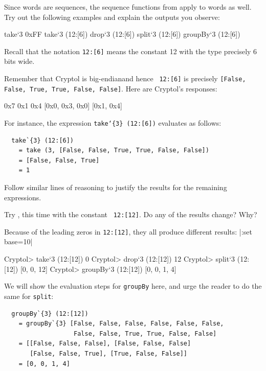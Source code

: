 \restartrepl
\begin{Exercise}\label{ex:words:4}
Since words are sequences, the sequence functions from
 apply to words as well.
Try out the following examples and explain the outputs you
observe:\indTake\indDrop\indSplit\indGroup
\begin{replinVerb}
  take`{3} 0xFF
  take`{3} (12:[6])
  drop`{3} (12:[6])
  split`{3} (12:[6])
  groupBy`{3} (12:[6])
\end{replinVerb}
\end{Exercise}
\noindent Recall that the notation {\tt 12:[6]} means the constant 12
with the type precisely 6 bits wide.
\begin{Answer}
  Remember that Cryptol is big-endian\indEndianness and hence {\tt
    12:[6]} is precisely {\tt [False, False, True, True, False,
    False]}.  Here are Cryptol's responses:\indTake
\begin{reploutVerb}
  0x7
  0x1
  0x4
  [0x0, 0x3, 0x0]
  [0x1, 0x4]
\end{reploutVerb}
For instance, the expression {\tt take`\{3\} (12:[6])} evaluates as follows:
\begin{Verbatim}
  take`{3} (12:[6])
    = take (3, [False, False, True, True, False, False])
    = [False, False, True]
    = 1
\end{Verbatim}
Follow similar lines of reasoning to justify the results for the
remaining expressions.
\end{Answer}
\begin{Exercise}\label{ex:words:5}
  Try , this time with the constant {\tt
    12:[12]}. Do any of the results change? Why?
\end{Exercise}
\begin{Answer}
  Because of the leading zeros in {\tt 12:[12]}, they all produce
  different results:\indTake\indDrop\indSplit\indGroup
\restartrepl
\hidereplin|:set base=10|
\begin{replPrompt}
  Cryptol> take`{3} (12:[12])
  0
  Cryptol> drop`{3} (12:[12])
  12
  Cryptol> split`{3} (12:[12])
  [0, 0, 12]
  Cryptol> groupBy`{3} (12:[12])
  [0, 0, 1, 4]
\end{replPrompt}
We will show the evaluation steps for {\tt groupBy} here, and urge the
reader to do the same for {\tt split}:
\begin{Verbatim}
  groupBy`{3} (12:[12])
    = groupBy`{3} [False, False, False, False, False, False,
                   False, False, True, True, False, False]
    = [[False, False, False], [False, False, False]
       [False, False, True], [True, False, False]]
    = [0, 0, 1, 4]
\end{Verbatim}
\end{Answer}

